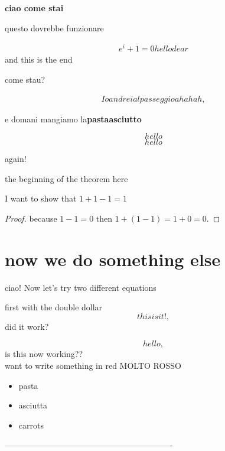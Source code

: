 \textbf{ciao come stai}

questo dovrebbe funzionare

\begin{align*}
e^i+1=0 hello dear
\end{align*}
and this is the end

come stau?

\begin{align}
Io andrei al passeggio ahahah,
\end{align}

e domani mangiamo la\textbf{pastaasciutto}

\begin{equation} hello \end{equation}
\begin{equation*} hello \end{equation*}

again! \centering

the beginning of the theorem {\Large here}
\begin{theorem}
I want to show that $1+1-1 = 1$
\end{theorem}
\begin{proof}
because $1-1=0$ then $1+(1-1)=1+0=0.$
\end{proof}

\section*{now we do something else}

ciao! Now let's try {\small two different equations}

first with the double dollar
$$
this is it!,
$$
did it work?

\[ hello, \] is this now working?? \\ want to write something in red {\color{red} MOLTO ROSSO }

\begin{itemize}

\item pasta
\item asciutta

\item carrots
\end{itemize}

-------------------------------------------------------------


